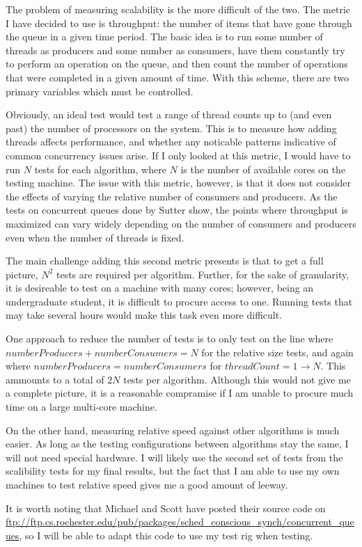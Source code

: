 \documentclass[12pt]{report}
\begin{document}
The problem of measuring scalability is the more difficult of the two. The
metric I have decided to use is throughput: the number of items that have gone
through the queue in a given time period. The basic idea is to run some number
of threads as producers and some number as consumers, have them constantly try
to perform an operation on the queue, and then count the number of operations
that were completed in a given amount of time. With this scheme,
there are two primary variables which must be controlled.

Obviously, an ideal test would test a range of thread counts up to (and even
past) the number of processors on the system. This is to measure how adding
threads affects performance, and whether any noticable patterns indicative of
common concurrency issues arise. If I only looked at this metric, I would have
to run $N$ tests for each algorithm, where $N$ is the number of available cores
on the testing machine. The issue with this metric, however, is that it does
not consider the effects of varying the relative number of consumers and
producers. As the tests on concurrent queues done by Sutter\cite{suttertest} show,
the points where throughput is maximized can vary widely depending on the
number of consumers and producers even when the number of threads is fixed.

The main challenge adding this second metric presents is that to get a full
picture, $N^2$ tests are required per algorithm. Further, for the sake of
granularity, it is desireable to test on a machine with many cores; however,
being an undergraduate student, it is difficult to procure access to one.
Running tests that may take several hours would make this task even more
difficult.

One approach to reduce the number of tests is to only test on the line where
$numberProducers+numberConsumers=N$ for the relative size tests, and again
where $numberProducers=numberConsumers$ for $threadCount=1\to N$. This ammounts
to a total of $2N$ tests per algorithm. Although this would not give me a
complete picture, it is a reasonable compramise if I am unable to procure much
time on a large multi-core machine.

On the other hand, measuring relative speed against other algorithms is much
easier. As long as the testing configurations between algorithms stay the same,
I will not need special hardware. I will likely use the second set of tests
from the scalibility tests for my final results, but the fact that I am able to
use my own machines to test relative speed gives me a good amount of leeway.

It is worth noting that Michael and Scott have posted their source code on
\url{ftp://ftp.cs.rochester.edu/pub/packages/sched\_conscious\_synch/concurrent\_queues},
so I will be able to adapt this code to use my test rig when testing.



\end{document}

